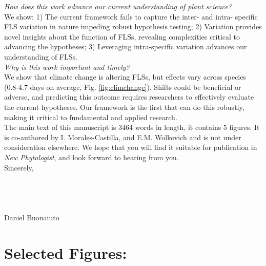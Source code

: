 \documentclass[11.5 pt]{article}\usepackage[]{graphicx}\usepackage[]{color}
\begin{document}
\noindent \emph{How does this work advance our current understanding of plant science?}\\
\noindent We show: 1) The current framework fails to capture the inter- and intra- specific FLS variation in nature impeding robust hypothesis testing; 2) Variation provides novel insights about the function of FLSs, revealing complexities critical to advancing the hypotheses; 3) Leveraging intra-specific variation advances our understanding of FLSs.\\ %

\noindent \emph{Why is this work important and timely?}\\
\noindent We show that climate change is altering FLSs, but effects vary across species (0.8-4.7 days on average, Fig. \ref{fig:climchange}). Shifts could be beneficial or adverse, and predicting this outcome requires researchers to effectively evaluate the current hypotheses. Our framework is the first that can do this robustly, making it critical to fundamental and applied research.\\

\noindent The main text of this manuscript is 3464 words in length, it contains 5 figures. It is co-authored by I. Morales-Castilla, and E.M. Wolkovich and is not under consideration elsewhere. We hope that you will find it suitable for publication in \textit{New Phytologist}, and look forward to hearing from you.
\\Sincerely,\\\\\\\\\\

\noindent Daniel Buonaiuto\\
\pagebreak
\section*{Selected Figures:}
\end{document}
